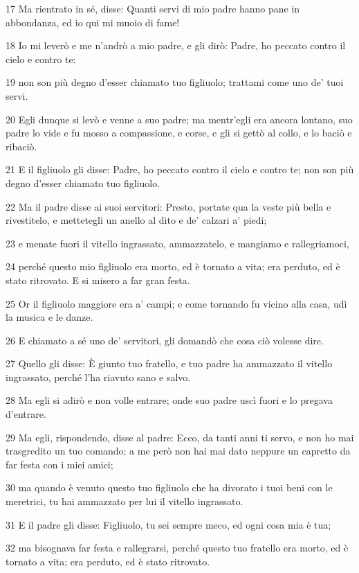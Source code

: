 \par 17 Ma rientrato in sé, disse: Quanti servi di mio padre hanno pane in abbondanza, ed io qui mi muoio di fame!
\par 18 Io mi leverò e me n'andrò a mio padre, e gli dirò: Padre, ho peccato contro il cielo e contro te:
\par 19 non son più degno d'esser chiamato tuo figliuolo; trattami come uno de' tuoi servi.
\par 20 Egli dunque si levò e venne a suo padre; ma mentr'egli era ancora lontano, suo padre lo vide e fu mosso a compassione, e corse, e gli si gettò al collo, e lo baciò e ribaciò.
\par 21 E il figliuolo gli disse: Padre, ho peccato contro il cielo e contro te; non son più degno d'esser chiamato tuo figliuolo.
\par 22 Ma il padre disse ai suoi servitori: Presto, portate qua la veste più bella e rivestitelo, e mettetegli un anello al dito e de' calzari a' piedi;
\par 23 e menate fuori il vitello ingrassato, ammazzatelo, e mangiamo e rallegriamoci,
\par 24 perché questo mio figliuolo era morto, ed è tornato a vita; era perduto, ed è stato ritrovato. E si misero a far gran festa.
\par 25 Or il figliuolo maggiore era a' campi; e come tornando fu vicino alla casa, udì la musica e le danze.
\par 26 E chiamato a sé uno de' servitori, gli domandò che cosa ciò volesse dire.
\par 27 Quello gli disse: È giunto tuo fratello, e tuo padre ha ammazzato il vitello ingrassato, perché l'ha riavuto sano e salvo.
\par 28 Ma egli si adirò e non volle entrare; onde suo padre uscì fuori e lo pregava d'entrare.
\par 29 Ma egli, rispondendo, disse al padre: Ecco, da tanti anni ti servo, e non ho mai trasgredito un tuo comando; a me però non hai mai dato neppure un capretto da far festa con i miei amici;
\par 30 ma quando è venuto questo tuo figliuolo che ha divorato i tuoi beni con le meretrici, tu hai ammazzato per lui il vitello ingrassato.
\par 31 E il padre gli disse: Figliuolo, tu sei sempre meco, ed ogni cosa mia è tua;
\par 32 ma bisognava far festa e rallegrarsi, perché questo tuo fratello era morto, ed è tornato a vita; era perduto, ed è stato ritrovato.

